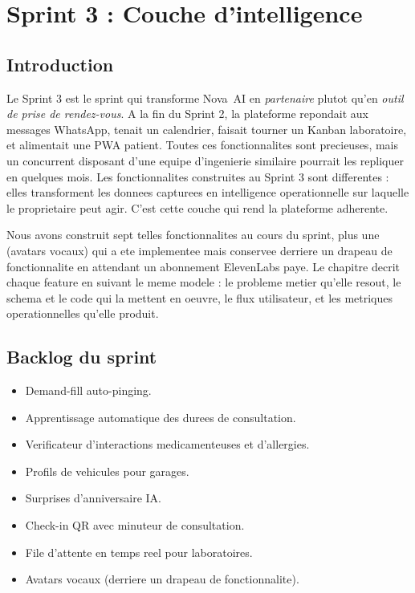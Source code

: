 \chapter{Sprint 3 : Couche d'intelligence}

\section{Introduction}
Le Sprint 3 est le sprint qui transforme Nova~AI en \emph{partenaire}
plutot qu'en \emph{outil de prise de rendez-vous}. A la fin du Sprint 2,
la plateforme repondait aux messages WhatsApp, tenait un calendrier,
faisait tourner un Kanban laboratoire, et alimentait une PWA patient.
Toutes ces fonctionnalites sont precieuses, mais un concurrent disposant
d'une equipe d'ingenierie similaire pourrait les repliquer en quelques
mois. Les fonctionnalites construites au Sprint 3 sont differentes :
elles transforment les donnees capturees en intelligence operationnelle
sur laquelle le proprietaire peut agir. C'est cette couche qui rend la
plateforme adherente.

Nous avons construit sept telles fonctionnalites au cours du sprint,
plus une (avatars vocaux) qui a ete implementee mais conservee derriere
un drapeau de fonctionnalite en attendant un abonnement ElevenLabs paye.
Le chapitre decrit chaque feature en suivant le meme modele : le
probleme metier qu'elle resout, le schema et le code qui la mettent en
oeuvre, le flux utilisateur, et les metriques operationnelles qu'elle
produit.

\section{Backlog du sprint}
\begin{itemize}
  \item Demand-fill auto-pinging.
  \item Apprentissage automatique des durees de consultation.
  \item Verificateur d'interactions medicamenteuses et d'allergies.
  \item Profils de vehicules pour garages.
  \item Surprises d'anniversaire IA.
  \item Check-in QR avec minuteur de consultation.
  \item File d'attente en temps reel pour laboratoires.
  \item Avatars vocaux (derriere un drapeau de fonctionnalite).
\end{itemize}

